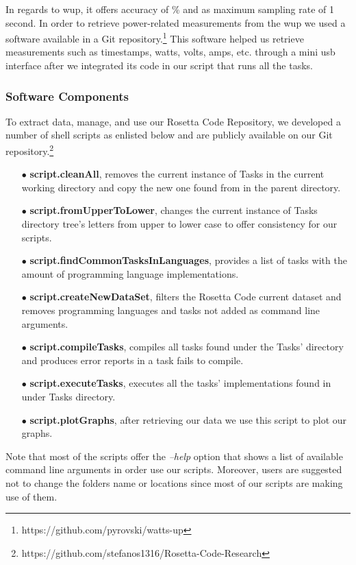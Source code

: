 In regards to {\sc wup}, it offers accuracy of \% and 
as maximum sampling rate of 1 second. 
In order to retrieve power-related measurements from the {\sc wup} 
we used a software available in a Git repository.\footnote{https://github.com/pyrovski/watts-up}
This software helped us retrieve measurements such as timestamps, 
watts, volts, amps, etc. through a mini {\sc usb} interface after 
we integrated its code in our script that runs all the tasks.

\subsubsection{Software Components} \label{software_components}
To extract data, manage, and use our Rosetta Code Repository, 
we developed a number of shell scripts as enlisted below and are 
publicly available on our Git repository.\footnote{https://github.com/stefanos1316/Rosetta-Code-Research} 

\begin{enumerate}
	\item [$\bullet$] \textbf{script.cleanAll}, removes the current instance 
	of Tasks in the current working directory and copy the new one found 
	from in the parent directory. 
	\item [$\bullet$] \textbf{script.fromUpperToLower}, changes the current 
	instance of Tasks directory tree's letters from upper to lower 
	case to offer consistency for our scripts. 
	\item [$\bullet$] \textbf{script.findCommonTasksInLanguages}, provides 
	a list of tasks with the amount of programming language implementations.
	\item [$\bullet$] \textbf{script.createNewDataSet}, filters the Rosetta 
	Code current dataset and removes programming languages and tasks not 
	added as command line arguments.
	\item [$\bullet$] \textbf{script.compileTasks}, compiles all tasks found 
	under the Tasks' directory and produces error reports in a task fails to 
	compile.
	\item [$\bullet$] \textbf{script.executeTasks}, executes all the tasks' 
	implementations found in under Tasks directory.
	\item [$\bullet$] \textbf{script.plotGraphs}, after retrieving our data 
	we use this script to plot our graphs.
\end{enumerate}

Note that most of the scripts offer the \textit{--help} option 
that shows a list of available command line arguments in order 
use our scripts.
Moreover, users are suggested not to change the folders name or 
locations since most of our scripts are making use of them. 

